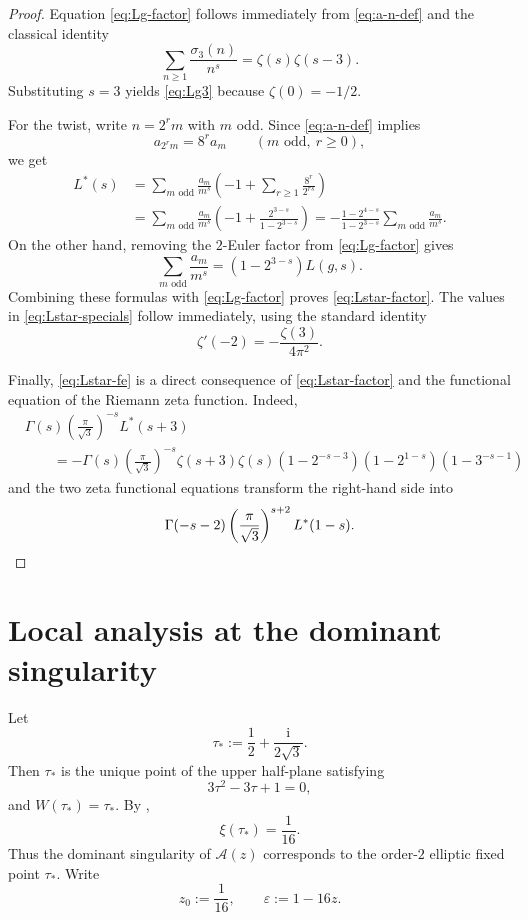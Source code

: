 \documentclass[11pt]{amsart}
\theoremstyle{definition}
\theoremstyle{remark}
\newcommand{\ii}{\mathrm{i}}
\newcommand{\sigthree}{\sigma_3}
\begin{document}
\begin{proof}
Equation \eqref{eq:Lg-factor} follows immediately from \eqref{eq:a-n-def} and the classical identity
\[
\sum_{n\ge 1}\frac{\sigthree(n)}{n^s}=\zeta(s)\zeta(s-3).
\]
Substituting $s=3$ yields \eqref{eq:Lg3} because $\zeta(0)=-1/2$.

For the twist, write $n=2^rm$ with $m$ odd. Since \eqref{eq:a-n-def} implies
\[
a_{2^rm}=8^r a_m\qquad(m\text{ odd},\ r\ge 0),
\]
we get
\begin{align*}
L^*(s)
&=\sum_{m\text{ odd}}\frac{a_m}{m^s}\left(-1+\sum_{r\ge 1}\frac{8^r}{2^{rs}}\right)\\
&=\sum_{m\text{ odd}}\frac{a_m}{m^s}\left(-1+\frac{2^{3-s}}{1-2^{3-s}}\right)
=-\frac{1-2^{4-s}}{1-2^{3-s}}\sum_{m\text{ odd}}\frac{a_m}{m^s}.
\end{align*}
On the other hand, removing the $2$-Euler factor from \eqref{eq:Lg-factor} gives
\[
\sum_{m\text{ odd}}\frac{a_m}{m^s}=(1-2^{3-s})L(g,s).
\]
Combining these formulas with \eqref{eq:Lg-factor} proves \eqref{eq:Lstar-factor}. The values in \eqref{eq:Lstar-specials} follow immediately, using the standard identity
\[
\zeta'(-2)=-\frac{\zeta(3)}{4\pi^2}.
\]

Finally, \eqref{eq:Lstar-fe} is a direct consequence of \eqref{eq:Lstar-factor} and the functional equation of the Riemann zeta function. Indeed,
\begin{align*}
&\Gamma(s)\left(\frac{\pi}{\sqrt 3}\right)^{-s}L^*(s+3)\\
&\qquad =-\Gamma(s)\left(\frac{\pi}{\sqrt 3}\right)^{-s}\zeta(s+3)\zeta(s)(1-2^{-s-3})(1-2^{1-s})(1-3^{-s-1})
\end{align*}
and the two zeta functional equations transform the right-hand side into
\[
\Gamma(-s-2)\left(\frac{\pi}{\sqrt 3}\right)^{s+2}L^*(1-s).
\qedhere
\]
\end{proof}

\section{Local analysis at the dominant singularity}\label{sec:local}

Let
\begin{equation}\label{eq:tau-star}
\tau_*:=\frac12+\frac{\ii}{2\sqrt 3}.
\end{equation}
Then $\tau_*$ is the unique point of the upper half-plane satisfying
\begin{equation}\label{eq:tau-star-quad}
3\tau^2-3\tau+1=0,
\end{equation}
and $W(\tau_*)=\tau_*$. By \cite[(3.11)]{Zhou1911},
\begin{equation}\label{eq:xi-at-taustar}
\xi(\tau_*)=\frac{1}{16}.
\end{equation}
Thus the dominant singularity of $\mathcal A(z)$ corresponds to the order-$2$ elliptic fixed point $\tau_*$. Write
\[
z_0:=\frac{1}{16},
\qquad
\varepsilon:=1-16z.
\]
\end{document}
